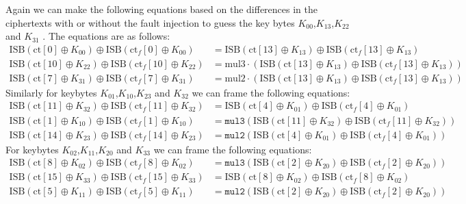 Again we can make the following equations based on the differences in the ciphertexts with or without the fault injection to guess the key bytes $K_{00}$,$K_{13}$,$K_{22}$ and $K_{31}$ . The equations are as follows:
\begin{align*}
    \text{ISB}(\text{ct}[0] \oplus K_{00}) \oplus \text{ISB}(\text{ct}_f[0] \oplus K_{00}) &= \text{ISB}(\text{ct}[13] \oplus K_{13}) \oplus \text{ISB}(\text{ct}_f[13] \oplus K_{13}) \\
    \text{ISB}(\text{ct}[10] \oplus K_{22}) \oplus \text{ISB}(\text{ct}_f[10] \oplus K_{22}) &= \text{mul3}\cdot \left( \text{ISB}(\text{ct}[13] \oplus K_{13}) \oplus \text{ISB}(\text{ct}_f[13] \oplus K_{13}) \right) \\
    \text{ISB}(\text{ct}[7] \oplus K_{31}) \oplus \text{ISB}(\text{ct}_f[7] \oplus K_{31}) &= \text{mul2} \cdot \left( \text{ISB}(\text{ct}[13] \oplus K_{13}) \oplus \text{ISB}(\text{ct}_f[13] \oplus K_{13}) \right)
    \end{align*}
Similarly for keybytes $K_{01}$,$K_{10}$,$K_{23}$ and $K_{32}$ we can frame the following equations:
\begin{align*}
    \text{ISB}(\text{ct}[11] \oplus K_{32}) \oplus \text{ISB}(\text{ct}_f[11] \oplus K_{32}) &= \text{ISB}(\text{ct}[4] \oplus K_{01}) \oplus \text{ISB}(\text{ct}_f[4] \oplus K_{01}) \\
    \text{ISB}(\text{ct}[1] \oplus K_{10}) \oplus \text{ISB}(\text{ct}_f[1] \oplus K_{10}) &= \texttt{mul3}\left( \text{ISB}(\text{ct}[11] \oplus K_{32}) \oplus \text{ISB}(\text{ct}_f[11] \oplus K_{32}) \right) \\
    \text{ISB}(\text{ct}[14] \oplus K_{23}) \oplus \text{ISB}(\text{ct}_f[14] \oplus K_{23}) &= \texttt{mul2}\left( \text{ISB}(\text{ct}[4] \oplus K_{01}) \oplus \text{ISB}(\text{ct}_f[4] \oplus K_{01}) \right)
    \end{align*}
For keybytes $K_{02}$,$K_{11}$,$K_{20}$ and $K_{33}$ we can frame the following equations:
\begin{align*}
    \text{ISB}(\text{ct}[8] \oplus K_{02}) \oplus \text{ISB}(\text{ct}_f[8] \oplus K_{02}) &= \texttt{mul3} \left( \text{ISB}(\text{ct}[2] \oplus K_{20}) \oplus \text{ISB}(\text{ct}_f[2] \oplus K_{20}) \right) \\
    \text{ISB}(\text{ct}[15] \oplus K_{33}) \oplus \text{ISB}(\text{ct}_f[15] \oplus K_{33}) &= \text{ISB}(\text{ct}[8] \oplus K_{02}) \oplus \text{ISB}(\text{ct}_f[8] \oplus K_{02}) \\
    \text{ISB}(\text{ct}[5] \oplus K_{11}) \oplus \text{ISB}(\text{ct}_f[5] \oplus K_{11}) &= \texttt{mul2} \left( \text{ISB}(\text{ct}[2] \oplus K_{20}) \oplus \text{ISB}(\text{ct}_f[2] \oplus K_{20}) \right)
    \end{align*}

